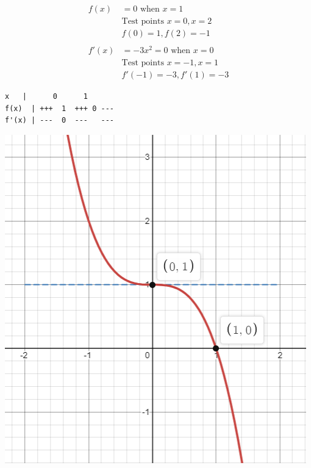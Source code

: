 \documentclass[14pt]{extarticle}
\begin{document}
\begin{multicols}{2}
\begin{align*}
	f(x) &= 0 \text{ when } x=1 \\
	& \text{Test points } x = 0, x=2 \\
	&f(0)= 1, f(2) = -1 \\\\
	f'(x) &= -3x^2 = 0 \text{ when } x=0 \\
	& \text{Test points } x =-1, x=1 \\
	&f'(-1)= -3, f'(1) = -3
\end{align*}
\vspace{2em}
\begin{verbatim}
x   |      0      1
f(x)  | +++  1  +++ 0 ---
f'(x) | ---  0  ---   ---
\end{verbatim}
\vfill\null
\columnbreak 
\includegraphics[width=1\linewidth]{11-1-a6}
\end{multicols}

\vspace{2em}
\end{document}
